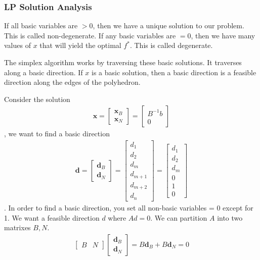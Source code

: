 \subsubsection{LP Solution Analysis}
If all basic variables are $>0$, then we have a unique solution to our problem. 
This is called non-degenerate.
If any basic variables are $=0$, then we have many values of $x$ that will yield the optimal $f^*$.
This is called degenerate.

The simplex algorithm works by traversing these basic solutions.
It traverses along a basic direction.
If $x$ is a basic solution, then a basic direction is a feasible direction along the edges of the polyhedron.

Consider the solution
\begin{align}
  \textbf{x} = 
  \begin{bmatrix}
     \textbf{x}_B \\
     \textbf{x}_N
  \end{bmatrix}
  =
  \begin{bmatrix}
    B^{-1} b \\
    0
  \end{bmatrix}
\end{align},
we want to find a basic direction
\begin{align}
  \textbf{d} = 
  \begin{bmatrix}
     \textbf{d}_B \\
     \textbf{d}_N
  \end{bmatrix}
  =
  \begin{bmatrix}
    d_1 \\
    d_2 \\
    d_m \\
    d_{m+1} \\
    d_{m+2} \\
    d_{n}
  \end{bmatrix}
  =
  \begin{bmatrix}
    d_1 \\
    d_2 \\
    d_m \\
    0 \\
    1 \\
    0
  \end{bmatrix}
\end{align}.
In order to find a basic direction, you set all non-basic variables = 0 except for 1.
We want a feasible direction $d$ where $Ad = 0$.
We can partition $A$ into two matrixes $B,N$.
\begin{align}
  \begin{bmatrix}
     B & N
  \end{bmatrix}
  \begin{bmatrix}
    \textbf{d}_B \\
    \textbf{d}_N
  \end{bmatrix} 
  = B \textbf{d}_B + B \textbf{d}_N
  = 0
\end{align}

